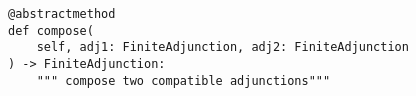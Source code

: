 \par\begin{minipage}{60ex}
\begin{verbatim}
@abstractmethod
def compose(
    self, adj1: FiniteAdjunction, adj2: FiniteAdjunction
) -> FiniteAdjunction:
    """ compose two compatible adjunctions"""
\end{verbatim}
\end{minipage}\par